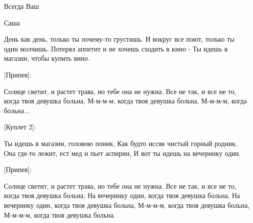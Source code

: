 Всегда Ваш

Саша

День как день, 
только ты почему-то грустишь. 
И вокруг все поют, только ты один молчишь. 
Потерял аппетит и не хочешь сходить в кино - Ты идешь в магазин, чтобы купить вино. 

[Припев]: 

Солнце светит, и растет трава, но тебе она не нужна. 
Все не так, и все не то, когда твоя девушка больна, 
М-м-м-м, когда твоя девушка больна, М-м-м-м, когда больна... 

[Куплет 2]: 

Ты идешь в магазин, головою поник, 
Как будто иссяк чистый горный родник. 
Она где-то лежит, ест мед и пьет аспирин, 
И вот ты идешь на вечеринку один. 

[Припев]: 

Солнце светит, и растет трава, но тебе она не нужна. 
Все не так, и все не то, когда твоя девушка больна, 
На вечеринку один, когда твоя девушка больна, 
На вечеринку один, когда твоя девушка больна, 
М-м-м-м, когда твоя девушка больна, М-м-м-м, 
когда твоя девушка больна.


